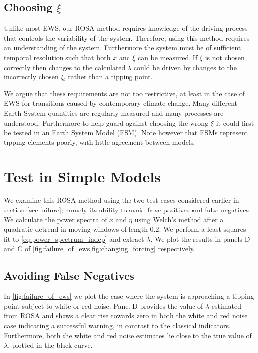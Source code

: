 \subsection{Choosing $\xi$}
Unlike most EWS, our ROSA method requires knowledge of
the driving process that controls the variability of the system.
Therefore, using this method requires an understanding
of the system. Furthermore the system must be of sufficient temporal resolution such that 
both $x$ and $\xi$ can be measured. If $\xi$ is not chosen
correctly then changes to the calculated $\lambda$ could be driven
by changes to the incorrectly chosen $\xi$, rather than a 
tipping point. 

We argue that these requirements are not too restrictive, at least in the 
case of EWS for transitions caused by contemporary
climate change. Many different Earth System quantities are regularly 
measured and many processes are understood. Furthermore to help 
guard against choosing the wrong $\xi$ it could first be tested in an Earth System Model (ESM). Note however that ESMs represent tipping elements 
poorly, with little agreement between models\cite{Drijfhout2015}.


\section{Test in Simple Models}
We examine this ROSA method using the two test cases considered earlier in 
section \cref{sec:failure}; namely its ability to avoid 
false positives and false negatives.
We calculate the power spectra of $x$ and $\eta$
using Welch's method\cite{Welch1967} after a quadratic 
detrend in moving windows of length $0.2$. We perform a least
squares fit to
\cref{eq:power_spectrum_indep} and extract $\lambda$. We plot
the results in panels D and C of \cref{fig:failure_of_ews,fig:changing_forcing} respectively.

\subsection{Avoiding False Negatives}
In \cref{fig:failure_of_ews} we plot the case
where the system is approaching a tipping point
subject to white or red noise. Panel D provides
the value of $\lambda$ estimated from ROSA and shows a clear
rise towards zero in both the white and red noise case indicating
a successful warning, in contrast to the classical indicators. Furthermore, both the
white and red noise estimates lie close to the true value of 
$\lambda$, plotted in the black curve.

